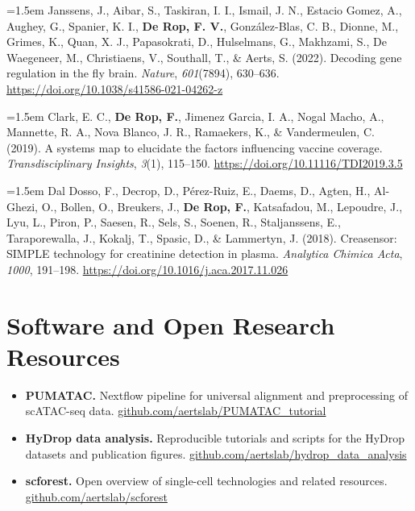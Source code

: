 \documentclass[10pt]{scrartcl}
\newcommand{\cvpublication}[1]{%
    \par\noindent\hangindent=1.5em\hangafter=1 #1\par\smallskip
}
\begin{document}
{\cvpublication{Janssens, J., Aibar, S., Taskiran, I. I., Ismail, J. N., Estacio Gomez, A., Aughey, G., Spanier, K. I., \textbf{De Rop, F. V.}, Gonz\'alez-Blas, C. B., Dionne, M., Grimes, K., Quan, X. J., Papasokrati, D., Hulselmans, G., Makhzami, S., De Waegeneer, M., Christiaens, V., Southall, T., \& Aerts, S. (2022). Decoding gene regulation in the fly brain. \emph{Nature}, \emph{601}(7894), 630--636. \href{https://doi.org/10.1038/s41586-021-04262-z}{https://doi.org/10.1038/s41586-021-04262-z}}

\cvpublication{Clark, E. C., \textbf{De Rop, F.}, Jimenez Garcia, I. A., Nogal Macho, A., Mannette, R. A., Nova Blanco, J. R., Ramaekers, K., \& Vandermeulen, C. (2019). A systems map to elucidate the factors influencing vaccine coverage. \emph{Transdisciplinary Insights}, \emph{3}(1), 115--150. \href{https://doi.org/10.11116/TDI2019.3.5}{https://doi.org/10.11116/TDI2019.3.5}}

\cvpublication{Dal Dosso, F., Decrop, D., P\'erez-Ruiz, E., Daems, D., Agten, H., Al-Ghezi, O., Bollen, O., Breukers, J., \textbf{De Rop, F.}, Katsafadou, M., Lepoudre, J., Lyu, L., Piron, P., Saesen, R., Sels, S., Soenen, R., Staljanssens, E., Taraporewalla, J., Kokalj, T., Spasic, D., \& Lammertyn, J. (2018). Creasensor: SIMPLE technology for creatinine detection in plasma. \emph{Analytica Chimica Acta}, \emph{1000}, 191--198. \href{https://doi.org/10.1016/j.aca.2017.11.026}{https://doi.org/10.1016/j.aca.2017.11.026}}

}

\section{Software and Open Research Resources}

{\raggedright
\begin{itemize}
    \item \textbf{PUMATAC.} Nextflow pipeline for universal alignment and preprocessing of scATAC-seq data. \href{https://github.com/aertslab/PUMATAC\_tutorial}{github.com/aertslab/PUMATAC\_tutorial}
    \item \textbf{HyDrop data analysis.} Reproducible tutorials and scripts for the HyDrop datasets and publication figures. \href{https://github.com/aertslab/hydrop\_data\_analysis}{github.com/aertslab/hydrop\_data\_analysis}
    \item \textbf{scforest.} Open overview of single-cell technologies and related resources. \href{https://github.com/aertslab/scforest}{github.com/aertslab/scforest}
\end{itemize}
}
\end{document}
